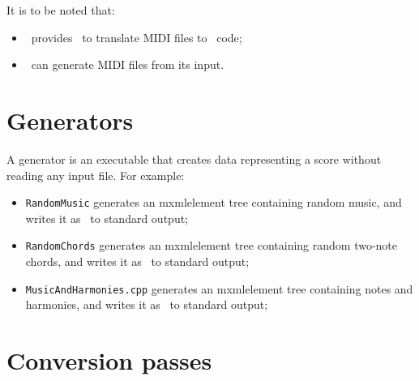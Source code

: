 \documentclass[12pt,a4paper]{article}
\begin{document}
It is to be noted that:
\begin{itemize}
\item \lily\ provides \midiToLy\ to translate MIDI files to \lily\ code;
\item \lily\ can generate MIDI files from its input.
\end{itemize} 


\section{Generators}

A generator is an executable that creates data representing a score without reading any input file.
For example:
\begin{itemize}
\item \texttt{RandomMusic} generates an mxmlelement tree containing random music, and writes it as \mxml\ to standard output;

\item \texttt{RandomChords} generates an mxmlelement tree containing random two-note chords, and writes it as \mxml\ to standard output;

\item \texttt{MusicAndHarmonies.cpp} generates an mxmlelement tree containing notes and harmonies, and writes it as \mxml\ to standard output;
\end{itemize}



\section{Conversion passes}
\end{document}
